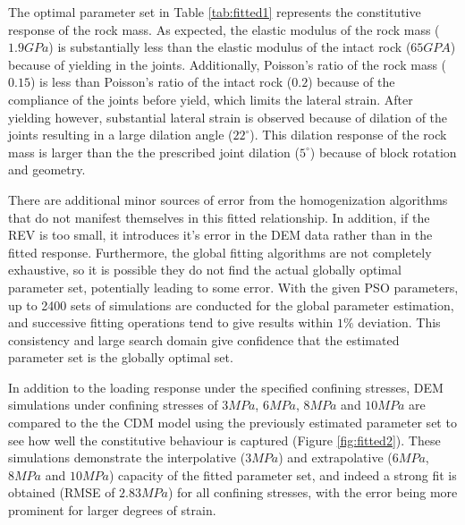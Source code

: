 The optimal parameter set in Table \ref{tab:fitted1} represents the constitutive response of the rock mass. As expected, the elastic modulus of the rock mass ($1.9 GPa$) is substantially less than the elastic modulus of the intact rock ($65 GPA$) because of yielding in the joints. Additionally, Poisson's ratio of the rock mass ($0.15$) is less than Poisson's ratio of the intact rock ($0.2$) because of the compliance of the joints before yield, which limits the lateral strain. After yielding however, substantial lateral strain is observed because of dilation of the joints resulting in a large dilation angle ($22^\circ$). This dilation response of the rock mass is larger than the the prescribed joint dilation ($5^\circ$) because of block rotation and geometry.

There are additional minor sources of error from the homogenization algorithms that do not manifest themselves in this fitted relationship.  In addition, if the REV is too small, it introduces it's error in the DEM data rather than in the fitted response. Furthermore, the global fitting algorithms are not completely exhaustive, so it is possible they do not find the actual globally optimal parameter set, potentially leading to some error. With the given PSO parameters, up to 2400 sets of simulations are conducted for the global parameter estimation, and successive fitting operations tend to give results within $1\%$ deviation. This consistency and large search domain give confidence that the estimated parameter set is the globally optimal set. 

In addition to the loading response under the specified confining stresses, DEM simulations under confining stresses of $3MPa$, $6MPa$, $8MPa$ and $10MPa$ are compared to the the CDM model using the previously estimated parameter set to see how well the constitutive behaviour is captured (Figure \ref{fig:fitted2}). These simulations demonstrate the interpolative ($3MPa$) and extrapolative ($6MPa$, $8MPa$ and $10MPa$) capacity of the fitted parameter set, and indeed a strong fit is obtained (RMSE of $2.83MPa$) for all confining stresses, with the error being more prominent for larger degrees of strain.